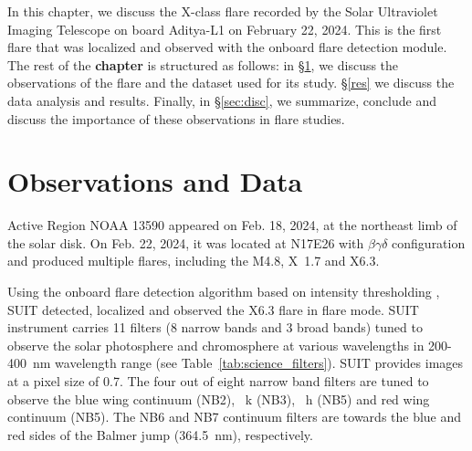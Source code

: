 In this chapter, we discuss the X-class flare recorded by the Solar Ultraviolet Imaging Telescope \citep[SUIT;][]{suit,suit_main} on board Aditya-L1 \citep{adityal1} on February 22, 2024. This is the first flare that was localized and observed with the onboard flare detection module. %
The rest of the {\bf chapter} is structured as follows: in \S\ref{obs}, we discuss the observations of the flare and the dataset used for its study. \S\ref{res} we discuss the data analysis and results. Finally, in \S\ref{sec:disc}, we summarize, conclude and discuss the importance of these observations in flare studies. 
\section{Observations and Data}\label{obs} 
Active Region NOAA 13590 appeared on Feb. 18, 2024, at the northeast limb of the solar disk. On Feb. 22, 2024, it was located at N17E26 with $\beta\gamma\delta$ configuration and produced multiple flares, including the M4.8, X~1.7 and X6.3.%

Using the onboard flare detection algorithm based on intensity thresholding \citep{flare_det}, SUIT detected, localized and observed the X6.3 flare in flare mode. SUIT instrument carries 11 filters (8 narrow bands and 3 broad bands) tuned to observe the solar photosphere and chromosphere at various wavelengths in 200-400~{nm} wavelength range (see Table~\ref{tab:science_filters}). SUIT provides images at a pixel size of 0.7{\arcsec}. The four out of eight narrow band filters are tuned to observe the  blue wing continuum (NB2), ~k (NB3), ~h (NB5) and  red wing continuum (NB5). The NB6 and NB7 continuum filters are towards the blue and red sides of the Balmer jump (364.5~nm), respectively. 

